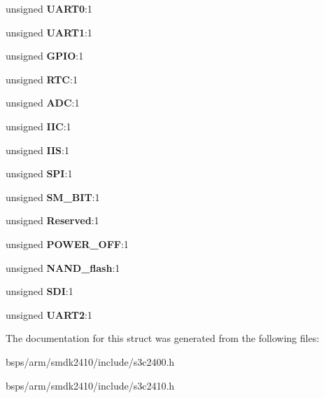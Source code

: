\begin{DoxyCompactItemize}
unsigned {\bfseries U\+A\+R\+T0}\+:1
\item 
\mbox{\label{structCLKCON_1_1__reg_a0bd4d952364df4ec726dca24d2be91ec}} 
unsigned {\bfseries U\+A\+R\+T1}\+:1
\item 
\mbox{\label{structCLKCON_1_1__reg_a0d0b9bd02723d1d995d7f8ec09b82730}} 
unsigned {\bfseries G\+P\+IO}\+:1
\item 
\mbox{\label{structCLKCON_1_1__reg_ad011b7b5ea40c38e259af26c07c7e056}} 
unsigned {\bfseries R\+TC}\+:1
\item 
\mbox{\label{structCLKCON_1_1__reg_a69feb67b71d0c5ecf326f0baad6940c3}} 
unsigned {\bfseries A\+DC}\+:1
\item 
\mbox{\label{structCLKCON_1_1__reg_a066a233823406790ae8a59b5eaa74b37}} 
unsigned {\bfseries I\+IC}\+:1
\item 
\mbox{\label{structCLKCON_1_1__reg_a9a7a2a9c84233fdfbacac61ace5a65b3}} 
unsigned {\bfseries I\+IS}\+:1
\item 
\mbox{\label{structCLKCON_1_1__reg_a0746190923c99c0c2de483651ba66b7b}} 
unsigned {\bfseries S\+PI}\+:1
\item 
\mbox{\label{structCLKCON_1_1__reg_ab780545172b0c535d67f7f6ed5875080}} 
unsigned {\bfseries S\+M\+\_\+\+B\+IT}\+:1
\item 
\mbox{\label{structCLKCON_1_1__reg_a58fefb751ae52f21df43dac618bcdda2}} 
unsigned {\bfseries Reserved}\+:1
\item 
\mbox{\label{structCLKCON_1_1__reg_a598ae491dd35ff1fc0eaa28ab2be24cc}} 
unsigned {\bfseries P\+O\+W\+E\+R\+\_\+\+O\+FF}\+:1
\item 
\mbox{\label{structCLKCON_1_1__reg_a2208ba2acf4ca32bfdaf0b45e1ff1595}} 
unsigned {\bfseries N\+A\+N\+D\+\_\+flash}\+:1
\item 
\mbox{\label{structCLKCON_1_1__reg_ac0661c6f291a3e1ca7bb3b04e78fbf98}} 
unsigned {\bfseries S\+DI}\+:1
\item 
\mbox{\label{structCLKCON_1_1__reg_a6d6672a02d5c76e3d64f57531cb0ce9f}} 
unsigned {\bfseries U\+A\+R\+T2}\+:1
\end{DoxyCompactItemize}


The documentation for this struct was generated from the following files\+:\begin{DoxyCompactItemize}
\item 
bsps/arm/smdk2410/include/s3c2400.\+h\item 
bsps/arm/smdk2410/include/s3c2410.\+h\end{DoxyCompactItemize}
